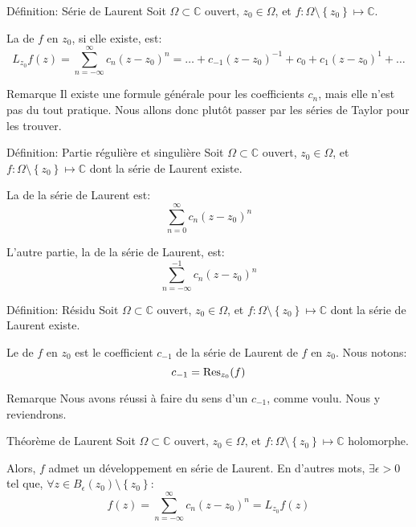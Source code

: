 \documentclass[a4paper]{article}
\begin{document}
\begin{parag}{Définition: Série de Laurent}
    Soit $\Omega \subset \mathbb{C}$ ouvert, $z_0 \in \Omega$, et $f: \Omega \setminus \left\{z_0\right\} \mapsto \mathbb{C}$. 

    La  de $f$ en $z_0$, si elle existe, est: 
    \[L_{z_0} f\left(z\right) = \sum_{n=-\infty}^{\infty} c_n\left(z - z_0\right)^n = \ldots + c_{-1}\left(z-z_0\right)^{-1} + c_0 + c_1 \left(z-z_0\right)^1 + \ldots\]

    \begin{subparag}{Remarque}
        Il existe une formule générale pour les coefficients $c_n$, mais elle n'est pas du tout pratique. Nous allons donc plutôt passer par les séries de Taylor pour les trouver.
    \end{subparag}
    
\end{parag}

\begin{parag}{Définition: Partie régulière et singulière}
    Soit $\Omega \subset \mathbb{C}$ ouvert, $z_0 \in \Omega$, et $f: \Omega \setminus \left\{z_0\right\} \mapsto \mathbb{C}$ dont la série de Laurent existe. 
    
    La  de la série de Laurent est: 
    \[\sum_{n=0}^{\infty} c_n\left(z - z_0\right)^n\]
    
    L'autre partie, la  de la série de Laurent, est: 
    \[\sum_{n=-\infty}^{-1} c_n\left(z-z_0\right)^n\]
\end{parag}


\begin{parag}{Définition: Résidu}
    Soit $\Omega \subset \mathbb{C}$ ouvert, $z_0 \in \Omega$, et $f: \Omega \setminus \left\{z_0\right\} \mapsto \mathbb{C}$ dont la série de Laurent existe. 

    Le  de $f$ en $z_0$ est le coefficient $c_{-1}$ de la série de Laurent de $f$ en $z_0$. Nous notons: 
    \[c_{-1} = \Res_{z_0}\left(f\right)\]

    \begin{subparag}{Remarque}
        Nous avons réussi à faire du sens d'un $c_{-1}$, comme voulu. Nous y reviendrons.
    \end{subparag}
\end{parag}

\begin{parag}{Théorème de Laurent}
    Soit $\Omega \subset \mathbb{C}$ ouvert, $z_0 \in \Omega$, et $f: \Omega \setminus \left\{z_0\right\} \mapsto \mathbb{C}$ holomorphe.

    Alors, $f$ admet un développement en série de Laurent. En d'autres mots, $\exists \epsilon >0$ tel que, $\forall z \in B_{\epsilon}\left(z_0\right) \setminus \left\{z_0\right\}$:
    \[f\left(z\right) = \sum_{n=-\infty}^{\infty} c_n \left(z-z_0\right)^n  = L_{z_0} f\left(z\right)\]
\end{parag}
\end{document}
